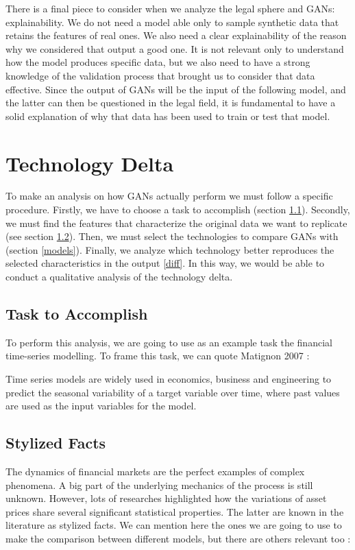 \documentclass[runningheads]{llncs}
\begin{document}
There is a final piece to consider when we analyze the legal sphere and GANs: explainability. We do not need a model able only to sample synthetic data that retains the features of real ones. We also need a clear explainability of the reason why we considered that output a good one. It is not relevant only to understand how the model produces specific data, but we also need to have a strong knowledge of the validation process that brought us to consider that data effective. Since the output of GANs will be the input of the following model, and the latter can then be questioned in the legal field, it is fundamental to have a solid explanation of why that data has been used to train or test that model.

\section{Technology Delta}\label{delta}
To make an analysis on how GANs actually perform we must follow a specific procedure. Firstly, we have to choose a task to accomplish (section \ref{task}). Secondly, we must find the features that characterize the original data we want to replicate (see section \ref{facts}). Then, we must select the technologies to compare GANs with (section \ref{models}). Finally, we analyze which technology better reproduces the selected characteristics in the output \ref{diff}. In this way, we would be able to conduct a qualitative analysis of the technology delta.

\subsection{Task to Accomplish}\label{task}
To perform this analysis, we are going to use as an example task the financial time-series modelling. To frame this task, we can quote Matignon 2007 \cite{matignon_2007}:

\begin{displayquote}
Time series models are widely used in economics, business and engineering to predict the seasonal variability of a target variable over time, where past values are used as the input variables for the model.
\end{displayquote}

\subsection{Stylized Facts}\label{facts}
The dynamics of financial markets are the perfect examples of complex phenomena. A big part of the underlying mechanics of the process is still unknown. However, lots of researches highlighted how the variations of asset prices share several significant statistical properties. The latter are known in the literature as stylized facts. We can mention here the ones we are going to use to make the comparison between different models, but there are others relevant too \cite{cont_2000}: 
\end{document}
